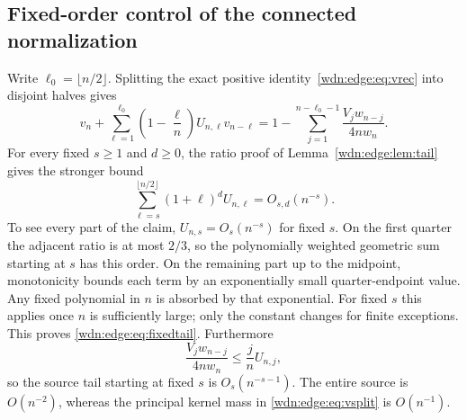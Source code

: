 \documentclass[11pt,letterpaper]{article}
\theoremstyle{remark}\newtheorem{remark}[theorem]{Remark}
\begin{document}
\subsection{Fixed-order control of the connected normalization}
Write $\ell_0=\lfloor n/2\rfloor$. Splitting the exact positive
identity~\eqref{wdn:edge:eq:vrec} into disjoint halves gives
\begin{equation}\label{wdn:edge:eq:vsplit}
 v_n+\sum_{\ell=1}^{\ell_0}
 \left(1-\frac\ell n\right)U_{n,\ell}v_{n-\ell}
 =1-\sum_{j=1}^{n-\ell_0-1}\frac{V_jw_{n-j}}{4nw_n}.
\end{equation}
For every fixed $s\ge1$ and $d\ge0$, the ratio proof of
Lemma~\ref{wdn:edge:lem:tail} gives the stronger bound
\begin{equation}\label{wdn:edge:eq:fixedtail}
 \sum_{\ell=s}^{\lfloor n/2\rfloor}(1+\ell)^d U_{n,\ell}
 =O_{s,d}(n^{-s}).
\end{equation}
To see every part of the claim, $U_{n,s}=O_s(n^{-s})$ for fixed $s$.
On the first quarter the adjacent ratio is at most $2/3$, so the
polynomially weighted geometric sum starting at $s$ has this order.
On the remaining part up to the midpoint, monotonicity bounds each term
by an exponentially small quarter-endpoint value. Any fixed polynomial
in $n$ is absorbed by that exponential. For fixed $s$ this applies once
$n$ is sufficiently large; only the constant changes for finite
exceptions. This proves \eqref{wdn:edge:eq:fixedtail}.
Furthermore
\[
 \frac{V_jw_{n-j}}{4nw_n}\le\frac jn U_{n,j},
\]
so the source tail starting at fixed $s$ is $O_s(n^{-s-1})$.
The entire source is $O(n^{-2})$, whereas the principal kernel mass
in \eqref{wdn:edge:eq:vsplit} is $O(n^{-1})$.
\end{document}
